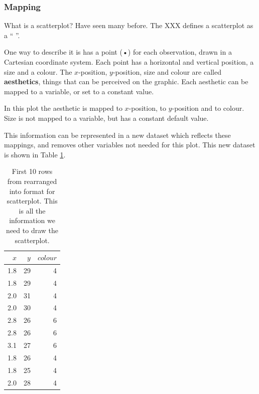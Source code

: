 \subsubsection{Mapping}

What is a scatterplot?  Have seen many before.  The XXX defines a scatterplot as a `` ''.

One way to describe it is has a point (•) for each observation, drawn in a Cartesian coordinate system.  Each point has a horizontal and vertical position, a size and a colour.  The $x$-position, $y$-position, size and colour are called {\bf aesthetics}, things that can be perceived on the graphic.  Each aesthetic can be mapped to a variable, or set to a constant value.  

In this plot the aesthetic  is mapped to $x$-position,  to $y$-position and  to colour.  Size is not mapped to a variable, but has a constant default value.  

This information can be represented in a new dataset which reflects these mappings, and removes other variables not needed for this plot. This new dataset is shown in Table \ref{tbl:mapping}.


\begin{table}[ht]
  \begin{center}
  \begin{tabular}{rrr}
    \toprule
    $x$ & $y$ & $colour$\\
    \midrule
    1.8 & 29 & 4\\
    1.8 & 29 & 4\\
    2.0 & 31 & 4\\
    2.0 & 30 & 4\\
    2.8 & 26 & 6\\
    2.8 & 26 & 6\\
    3.1 & 27 & 6\\
    1.8 & 26 & 4\\
    1.8 & 25 & 4\\
    2.0 & 28 & 4\\
    \bottomrule
  \end{tabular}
  \end{center}
  \caption{First 10 rows from  rearranged into format for scatterplot.  This is all the information we need to draw the scatterplot.}
  \label{tbl:mapping}
\end{table}

